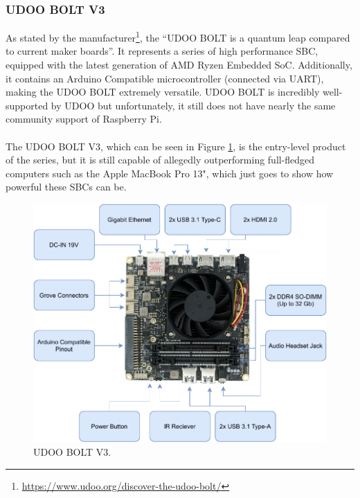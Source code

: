 \subsubsection{UDOO BOLT V3}

As stated by the manufacturer\footnote{\url{https://www.udoo.org/discover-the-udoo-bolt/}}, the ``UDOO BOLT is a quantum leap compared to current maker boards''. It represents a series of high performance \acs{SBC}, equipped with the latest generation of AMD Ryzen Embedded SoC. Additionally, it contains an Arduino Compatible microcontroller (connected via UART), making the UDOO BOLT extremely versatile.
UDOO BOLT is incredibly well-supported by UDOO but unfortunately, it still does not have nearly the same community support of Raspberry Pi.

\paragraph{} The UDOO BOLT V3, which can be seen in Figure \ref{fig:udoobolt-image}, is the entry-level product of the series, but it is still capable of allegedly outperforming full-fledged computers such as the Apple MacBook Pro 13", which just goes to show how powerful these \acs{SBC}s can be.

\begin{figure}[H]
    \centering
    \includegraphics[width=\linewidth]{images/udoobolt-diag.pdf}
    \caption{UDOO BOLT V3.}
    \label{fig:udoobolt-image}
\end{figure}
\clearpage 

